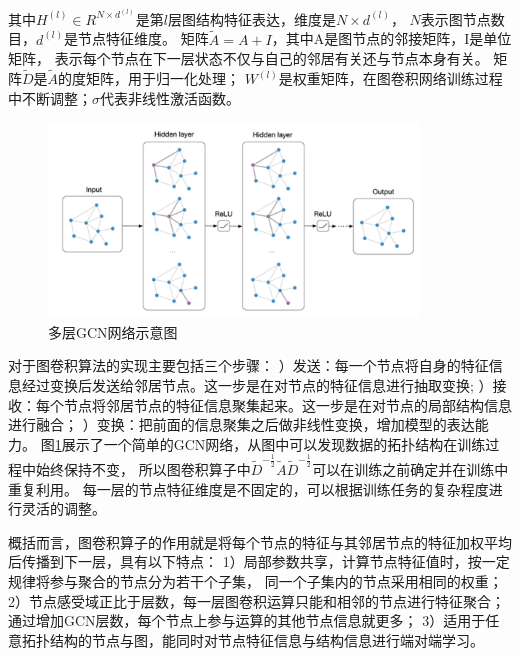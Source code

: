 \noindent 其中$H^{(l)} \in R^{N \times d^{(l)}}$是第$l$层图结构特征表达，维度是$N \times d^{(l)}$，
$N$表示图节点数目，$d^{(l)}$是节点特征维度。
矩阵$\tilde{A} = A + I$，其中A是图节点的邻接矩阵，I是单位矩阵，
表示每个节点在下一层状态不仅与自己的邻居有关还与节点本身有关。
矩阵$\tilde{D}$是$\tilde{A}$的度矩阵，用于归一化处理；
$W^{(l)}$是权重矩阵，在图卷积网络训练过程中不断调整；$\sigma$代表非线性激活函数。

\begin{figure}[htp]
	\centering
	\includegraphics[width=0.88\textwidth]{figures/GCN.png}
	\caption{多层GCN网络示意图}
	\label{fig:gcn}
\end{figure}

对于图卷积算法的实现主要包括三个步骤：
）发送：每一个节点将自身的特征信息经过变换后发送给邻居节点。这一步是在对节点的特征信息进行抽取变换;
）接收：每个节点将邻居节点的特征信息聚集起来。这一步是在对节点的局部结构信息进行融合；
）变换：把前面的信息聚集之后做非线性变换，增加模型的表达能力。
图\ref{fig:gcn}展示了一个简单的GCN网络，从图中可以发现数据的拓扑结构在训练过程中始终保持不变，
所以图卷积算子中$\tilde{D}^{-\frac{1}{2}} \tilde{A} \tilde{D}^{-\frac{1}{2}}$可以在训练之前确定并在训练中重复利用。
每一层的节点特征维度是不固定的，可以根据训练任务的复杂程度进行灵活的调整。

概括而言，图卷积算子的作用就是将每个节点的特征与其邻居节点的特征加权平均后传播到下一层，具有以下特点：
1）局部参数共享，计算节点特征值时，按一定规律将参与聚合的节点分为若干个子集，
同一个子集内的节点采用相同的权重；
2）节点感受域正比于层数，每一层图卷积运算只能和相邻的节点进行特征聚合；通过增加GCN层数，每个节点上参与运算的其他节点信息就更多；
3）适用于任意拓扑结构的节点与图，能同时对节点特征信息与结构信息进行端对端学习。





